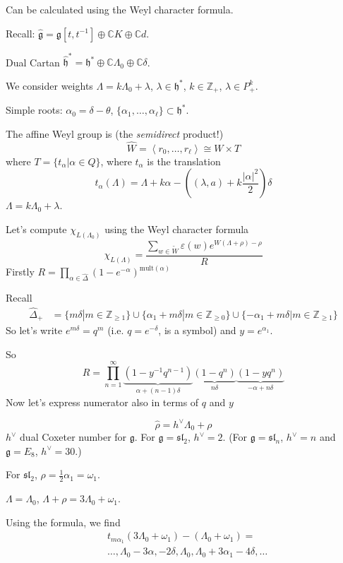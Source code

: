 Can be calculated using the Weyl character formula.

Recall: $\hat{\mathfrak{g}}=\mathfrak{g}[t,t^{-1}] \oplus \mathbb{C}K
\oplus \mathbb{C}d$.

Dual Cartan $\hat{\mathfrak{h}}^*=\mathfrak{h}^*\oplus\mathbb{C}\Lambda_0
\oplus\mathbb{C}\delta$.

We consider weights $\Lambda=k\Lambda_0+\lambda$, $\lambda \in \mathfrak{h}^*$,
$k \in \mathbb{Z}_+$, $\lambda \in P_+^k$.

Simple roots: $\alpha_0=\delta-\theta$, $\{\alpha_1,\ldots,\alpha_\ell\}
\subset \mathfrak{h}^*$.

The affine Weyl group is (the {\it semidirect} product!)
$$
\widehat{W}=\left<r_0,\ldots,r_\ell\right> \cong W \times T
$$
where $T=\{t_\alpha | \alpha \in Q\}$, where
$t_\alpha$ is the translation
$$
t_\alpha(\Lambda)=\Lambda+k\alpha-\left((\lambda,a)+k
\frac{|\alpha|^2}{2}\right)\delta
$$
$\Lambda=k\Lambda_0+\lambda$.

\medskip\noindent
Let's compute $\chi_{L(\Lambda_0)}$ using the Weyl character formula
$$
\chi_{L(\Lambda)}=\frac{\sum_{w \in \tilde{W}}\varepsilon(w)
e^{W(\Lambda+\rho)-\rho}}{R}
$$
Firstly $R=\prod_{\alpha \in \hat{\Delta}}(1-e^{-\alpha})
^{\text{mult}(\alpha)}$

Recall
\begin{align*}
\hat{\Delta}_+&=\{m\delta | m \in \mathbb{Z}_{\geq 1}\}
\cup \{\alpha_1+m\delta|m \in \mathbb{Z}_{\geq 0}\}
\cup \{-\alpha_1+m \delta |m \in \mathbb{Z}_{\geq 1}\}
\end{align*}
So let's write $e^{m \delta}=q^m$ (i.e. $q = e^{-\delta}$, is a symbol)
and $y=e^{\alpha_1}$.

So
$$
R=\prod_{n=1}^{\infty}\underbrace{(1-y^{-1}q^{n-1})
}_{\alpha+(n-1)\delta
}\underbrace{(1-q^n)
}_{n\delta}\underbrace{(1-yq^n)
}_{-\alpha+n\delta}
$$
Now let's express numerator also in terms of $q$ and $y$

$$
\hat{\rho}=h^\vee\Lambda_0+\rho
$$
$h^\vee$ dual Coxeter number for $\mathfrak{g}$. 
For $\mathfrak{g}=\mathfrak{sl}_2$, $h^\vee=2$.
(For $\mathfrak{g}=\mathfrak{sl}_n$, $h^\vee=n$ and $\mathfrak{g}=E_8$,
$h^\vee=30$.)

For $\mathfrak{sl}_2$, $\rho=\frac{1}{2}\alpha_1=\omega_1$.

$\Lambda=\Lambda_0$, $\Lambda+\rho=3\Lambda_0+\omega_1$.

Using the formula, we find
\begin{align*}
&t_{m \alpha_1}(3\Lambda_0+\omega_1)-(\Lambda_0+\omega_1)=\\
&\ldots,\Lambda_0-3\alpha,-2\delta,\Lambda_0,\Lambda_0+3\alpha_1-4\delta,\ldots
\end{align*}

